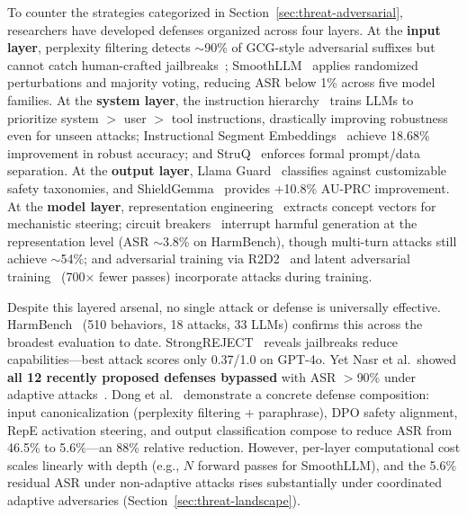 To counter the strategies categorized in Section~\ref{sec:threat-adversarial}, researchers have developed defenses organized across four layers. At the \textbf{input layer}, perplexity filtering detects $\sim$90\% of GCG-style adversarial suffixes but cannot catch human-crafted jailbreaks~\cite{alon2023perplexity}; SmoothLLM~\cite{robey2023smoothllm} applies randomized perturbations and majority voting, reducing ASR below 1\% across five model families. At the \textbf{system layer}, the instruction hierarchy~\cite{wallace2024hierarchy} trains LLMs to prioritize system $>$ user $>$ tool instructions, drastically improving robustness even for unseen attacks; Instructional Segment Embeddings~\cite{wu2025ise} achieve 18.68\% improvement in robust accuracy; and StruQ~\cite{chen2025struq} enforces formal prompt/data separation. At the \textbf{output layer}, Llama Guard~\cite{inan2023llamaguard} classifies against customizable safety taxonomies, and ShieldGemma~\cite{zeng2024shieldgemma} provides +10.8\% AU-PRC improvement. At the \textbf{model layer}, representation engineering~\cite{zou2023repe} extracts concept vectors for mechanistic steering; circuit breakers~\cite{zou2024circuitbreakers} interrupt harmful generation at the representation level (ASR $\sim$3.8\% on HarmBench), though multi-turn attacks still achieve $\sim$54\%; and adversarial training via R2D2~\cite{mazeika2024harmbench} and latent adversarial training~\cite{sheshadri2024lat} (700$\times$ fewer passes) incorporate attacks during training.

Despite this layered arsenal, no single attack or defense is universally effective. HarmBench~\cite{mazeika2024harmbench} (510 behaviors, 18 attacks, 33 LLMs) confirms this across the broadest evaluation to date. StrongREJECT~\cite{souly2024strongreject} reveals jailbreaks reduce capabilities---best attack scores only 0.37/1.0 on GPT-4o. Yet Nasr et al.\ showed \textbf{all 12 recently proposed defenses bypassed} with ASR $>$90\% under adaptive attacks~\cite{nasr2025attacker}. Dong et al.~\cite{dong2024hierarchical} demonstrate a concrete defense composition: input canonicalization (perplexity filtering + paraphrase), DPO safety alignment, RepE activation steering, and output classification compose to reduce ASR from 46.5\% to 5.6\%---an 88\% relative reduction. However, per-layer computational cost scales linearly with depth (e.g., $N$ forward passes for SmoothLLM), and the 5.6\% residual ASR under non-adaptive attacks rises substantially under coordinated adaptive adversaries (Section~\ref{sec:threat-landscape}).


